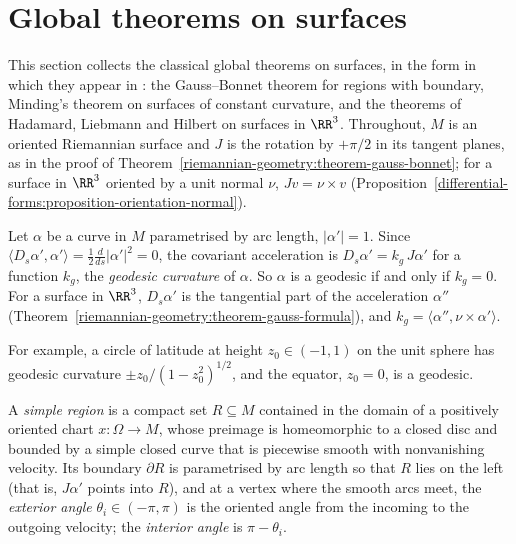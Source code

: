 \section{Global theorems on surfaces}\label{riemannian-geometry:section-surfaces-global}

This section collects the classical global theorems on surfaces, in the form in which they appear in \cite[Chapters 4 and 5]{do-carmo-curves-surfaces}:
the Gauss--Bonnet theorem for regions with boundary, Minding's theorem on surfaces of constant curvature, and the theorems of Hadamard, Liebmann and Hilbert on
surfaces in $\RR^3$. Throughout, $M$ is an oriented Riemannian surface and $J$ is the rotation by $+\pi/2$ in its tangent planes, as in the proof of
Theorem~\ref{riemannian-geometry:theorem-gauss-bonnet}; for a surface in $\RR^3$ oriented by a unit normal $\nu$, $Jv = \nu \times v$
(Proposition~\ref{differential-forms:proposition-orientation-normal}).

\begin{definition}\label{riemannian-geometry:definition-geodesic-curvature}
Let $\alpha$ be a curve in $M$ parametrised by arc length, $|\alpha'| = 1$. Since $\langle D_s\alpha', \alpha'\rangle = \frac12\frac{d}{ds}|\alpha'|^2 = 0$, the covariant acceleration is
$D_s\alpha' = k_g\,J\alpha'$ for a function $k_g$, the \emph{geodesic curvature} of $\alpha$. So $\alpha$ is a geodesic if and only if $k_g = 0$. For a surface in $\RR^3$,
$D_s\alpha'$ is the tangential part of the acceleration $\alpha''$ (Theorem~\ref{riemannian-geometry:theorem-gauss-formula}), and $k_g = \langle\alpha'', \nu \times \alpha'\rangle$.
\end{definition}

For example, a circle of latitude at height $z_0 \in (-1, 1)$ on the unit sphere has geodesic curvature $\pm z_0/(1 - z_0^2)^{1/2}$, and the equator, $z_0 = 0$, is a geodesic.

A \emph{simple region} is a compact set $R \subseteq M$ contained in the domain of a positively oriented chart $x \colon \Omega \to M$, whose preimage is homeomorphic to a closed
disc and bounded by a simple closed curve that is piecewise smooth with nonvanishing velocity. Its boundary $\partial R$ is parametrised by arc length so that $R$ lies on the left
(that is, $J\alpha'$ points into $R$), and at a vertex where the smooth arcs meet, the \emph{exterior angle} $\theta_i \in (-\pi, \pi)$ is the oriented angle from the incoming to the
outgoing velocity; the \emph{interior angle} is $\pi - \theta_i$.

